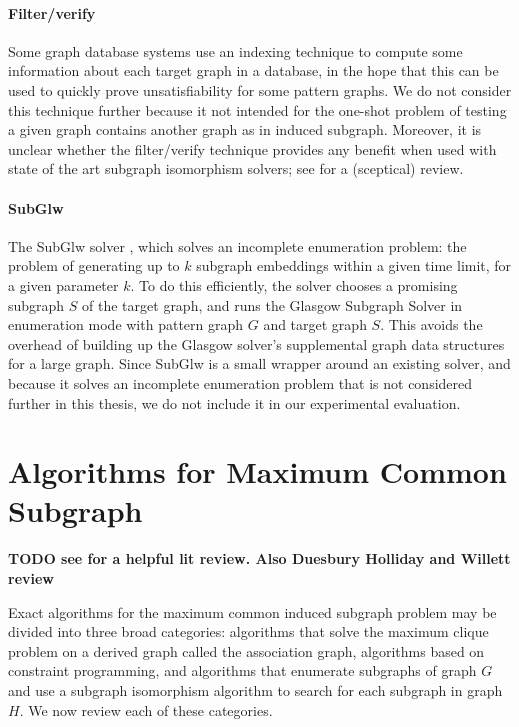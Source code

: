 \paragraph*{Filter/verify} Some graph database systems use an indexing technique
to compute some information about each target graph in a database, in the hope that
this can be used to quickly prove unsatisfiability for some pattern graphs.
We do not consider this technique further because it not intended for the one-shot
problem of testing a given graph contains another graph as in induced subgraph.
Moreover, it is unclear whether the filter/verify technique provides any benefit
when used with state of the art subgraph isomorphism solvers; see
\citet{DBLP:journals/jair/McCreeshPST18} for a (sceptical) review.

\paragraph*{SubGlw}
The SubGlw solver \citep{DBLP:journals/access/AnsariJA21},
which solves an incomplete enumeration problem: the problem of
generating up to $k$ subgraph embeddings within a given time limit, for a given
parameter $k$. To do this efficiently, the solver chooses a promising
subgraph $S$ of the target graph, and runs the Glasgow Subgraph Solver in enumeration
mode with pattern graph $G$ and target graph $S$. This avoids the overhead of
building up the Glasgow solver's supplemental graph data structures for a large
graph.  Since SubGlw is a small wrapper around an existing solver, and because
it solves an incomplete enumeration problem that is not considered further
in this thesis, we do not include it in our experimental evaluation.

\section{Algorithms for Maximum Common Subgraph} 

\textbf{TODO see \citet{DBLP:journals/jcamd/RaymondW02a} for a helpful lit review.
Also Duesbury Holliday and Willett review}

Exact algorithms for the maximum common induced subgraph problem may be divided
into three broad categories: algorithms that solve the maximum clique problem
on a derived graph called the association graph, algorithms based on
constraint programming, and algorithms that enumerate subgraphs of graph $G$
and use a subgraph isomorphism algorithm to search for each subgraph in graph
$H$.  We now review each of these categories.


